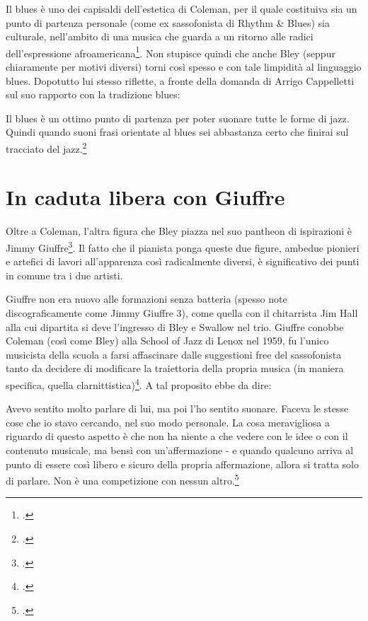 Il blues è uno dei capisaldi dell'estetica di Coleman, per il quale costituiva sia un punto di partenza personale (come ex sassofonista di Rhythm \& Blues) sia culturale, nell'ambito di una musica che guarda a un ritorno alle radici dell'espressione afroamericana\footcite[38]{Cogswell1989}. Non stupisce quindi che anche Bley (seppur chiaramente per motivi diversi) torni così spesso e con tale limpidità al linguaggio blues. Dopotutto lui stesso riflette, a fronte della domanda di Arrigo Cappelletti sul suo rapporto con la tradizione blues:
\begin{fquote}
	Il blues è un ottimo punto di partenza per poter suonare tutte le forme di jazz. Quindi quando suoni frasi orientate al blues sei abbastanza certo che finirai sul tracciato del jazz.\footcite[135]{cappelletti}
\end{fquote}
\section{In caduta libera con Giuffre}
Oltre a Coleman, l'altra figura che Bley piazza nel suo pantheon di ispirazioni è Jimmy Giuffre\footcite{hamilton}. Il fatto che il pianista ponga queste due figure, ambedue pionieri e artefici di lavori all'apparenza così radicalmente diversi, è significativo dei punti in comune tra i due artisti.\par
Giuffre non era nuovo alle formazioni senza batteria (spesso note discograficamente come Jimmy Giuffre 3), come quella con il chitarrista Jim Hall alla cui dipartita si deve l'ingresso di Bley e Swallow nel trio. Giuffre conobbe Coleman (così come Bley) alla School of Jazz di Lenox nel 1959, fu l'unico musicista della scuola a farsi affascinare dalle suggestioni free del sassofonista tanto da decidere di modificare la traiettoria della propria musica (in maniera specifica, quella clarnittistica)\footcite[69]{litweiler}. A tal proposito ebbe da dire:
\begin{fquote}
	Avevo sentito molto parlare di lui, ma poi l'ho sentito suonare. Faceva le stesse cose che io stavo cercando, nel suo modo personale. La cosa meravigliosa a riguardo di questo aspetto è che non ha niente a che vedere con le idee o con il contenuto musicale, ma bensì con un'affermazione - e quando qualcuno arriva al punto di essere così libero e sicuro della propria affermazione, allora si tratta solo di parlare. Non è una competizione con nessun altro.\footcite{stephens}
\end{fquote}
